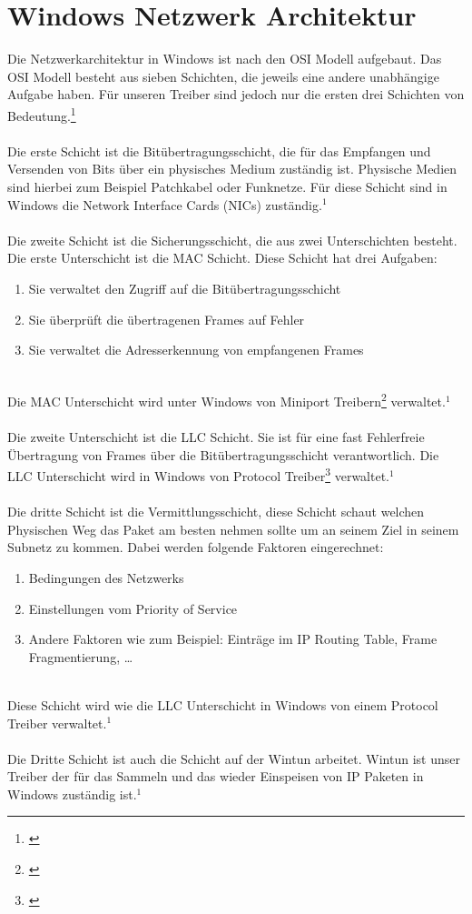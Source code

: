 \section{Windows Netzwerk Architektur}
Die Netzwerkarchitektur in Windows ist nach den OSI Modell aufgebaut. Das OSI Modell besteht aus sieben Schichten, die jeweils eine andere unabhängige Aufgabe haben. Für unseren Treiber sind jedoch nur die ersten drei Schichten von Bedeutung.\footnote[1]{\cite[Vgl.][]{27}}
\\\\
Die erste Schicht ist die Bitübertragungsschicht, die für das Empfangen und Versenden von Bits über ein physisches Medium zuständig ist. Physische Medien sind hierbei zum Beispiel Patchkabel oder Funknetze. Für diese Schicht sind in Windows die Network Interface Cards (NICs) zuständig.$^{1}$
\\\\
Die zweite Schicht ist die Sicherungsschicht, die aus zwei Unterschichten besteht. Die erste Unterschicht ist die MAC Schicht. Diese Schicht hat drei Aufgaben:
\\
\begin{enumerate}
    \item Sie verwaltet den Zugriff auf die Bitübertragungsschicht
    \item Sie überprüft die übertragenen Frames auf Fehler
    \item Sie verwaltet die Adresserkennung von empfangenen Frames
\end{enumerate}
\ \\
Die MAC Unterschicht wird unter Windows von Miniport Treibern\footnote[3]{\cite[Vgl.][]{25}} verwaltet.$^{1}$
\\\\
Die zweite Unterschicht ist die LLC Schicht. Sie ist für eine fast Fehlerfreie Übertragung von Frames über die Bitübertragungsschicht verantwortlich. Die LLC Unterschicht wird in Windows von Protocol Treiber\footnote[5]{\cite[Vgl.][]{26}} verwaltet.$^{1}$
\\\\
Die dritte Schicht ist die Vermittlungsschicht, diese Schicht schaut welchen Physischen Weg das Paket am besten nehmen sollte um an seinem Ziel in seinem Subnetz zu kommen. Dabei werden folgende Faktoren eingerechnet:
\\
\begin{enumerate}
    \item Bedingungen des Netzwerks
    \item Einstellungen vom Priority of Service
    \item Andere Faktoren wie zum Beispiel: Einträge im IP Routing Table, Frame Fragmentierung, …
\end{enumerate}
\ \\
Diese Schicht wird wie die LLC Unterschicht in Windows von einem Protocol Treiber verwaltet.$^{1}$
\\\\
Die Dritte Schicht ist auch die Schicht auf der Wintun arbeitet. Wintun ist unser Treiber der für das Sammeln und das wieder Einspeisen von IP Paketen in Windows zuständig ist.$^{1}$

